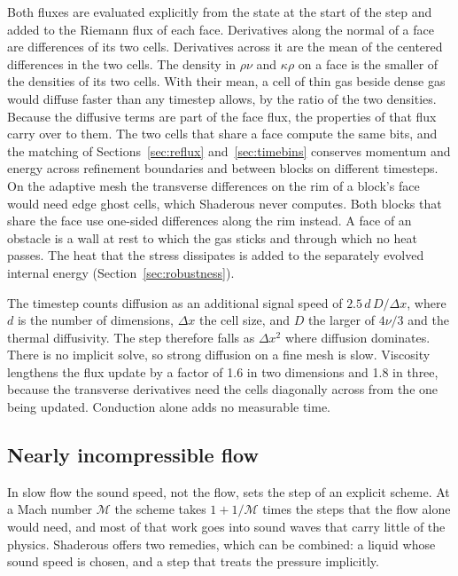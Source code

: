 \documentclass[twocolumn]{aastex701}
\begin{document}
Both fluxes are evaluated explicitly from the state at the start of the step and added to the Riemann flux of each face. Derivatives along the normal of a face are differences of its two cells. Derivatives across it are the mean of the centered differences in the two cells. The density in $\rho\nu$ and $\kappa\rho$ on a face is the smaller of the densities of its two cells. With their mean, a cell of thin gas beside dense gas would diffuse faster than any timestep allows, by the ratio of the two densities. Because the diffusive terms are part of the face flux, the properties of that flux carry over to them. The two cells that share a face compute the same bits, and the matching of Sections~\ref{sec:reflux} and~\ref{sec:timebins} conserves momentum and energy across refinement boundaries and between blocks on different timesteps. On the adaptive mesh the transverse differences on the rim of a block's face would need edge ghost cells, which Shaderous never computes. Both blocks that share the face use one-sided differences along the rim instead. A face of an obstacle is a wall at rest to which the gas sticks and through which no heat passes. The heat that the stress dissipates is added to the separately evolved internal energy (Section~\ref{sec:robustness}).

The timestep counts diffusion as an additional signal speed of $2.5\,d\,D/\Delta x$, where $d$ is the number of dimensions, $\Delta x$ the cell size, and $D$ the larger of $4\nu/3$ and the thermal diffusivity. The step therefore falls as $\Delta x^2$ where diffusion dominates. There is no implicit solve, so strong diffusion on a fine mesh is slow. Viscosity lengthens the flux update by a factor of 1.6 in two dimensions and 1.8 in three, because the transverse derivatives need the cells diagonally across from the one being updated. Conduction alone adds no measurable time.

\subsection{Nearly incompressible flow}
\label{sec:implicit}

In slow flow the sound speed, not the flow, sets the step of an explicit scheme. At a Mach number $\mathcal{M}$ the scheme takes $1 + 1/\mathcal{M}$ times the steps that the flow alone would need, and most of that work goes into sound waves that carry little of the physics. Shaderous offers two remedies, which can be combined: a liquid whose sound speed is chosen, and a step that treats the pressure implicitly.
\end{document}
